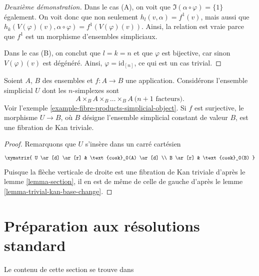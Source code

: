 \begin{proof}[Deuxième démonstration]
\medskip\noindent
Dans le cas (A), on voit que $\Im(\alpha \circ \varphi) = \{1\}$ également.
On voit donc que non seulement $h_l(v, \alpha) = f^1(v)$, mais aussi que
$h_k(V(\varphi)(v), \alpha \circ \varphi) = f^1(V(\varphi)(v))$.
Ainsi, la relation est vraie parce que $f^1$ est un morphisme d'ensembles
simpliciaux.

\medskip\noindent
Dans le cas (B), on conclut que $l = k = n$ et que
$\varphi$ est bijective, car sinon $V(\varphi)(v)$
est dégénéré. Ainsi, $\varphi = \text{id}_{[n]}$, ce qui est un cas trivial.
\end{proof}

\begin{lemma}
\label{lemma-cosk-minus-one-equivalence}
Soient $A$, $B$ des ensembles et $f : A \to B$ une application. Considérons
l'ensemble simplicial $U$ dont les $n$-simplexes sont
$$
A \times_B A \times_B \ldots \times_B A\ (n + 1 \text{ facteurs)}.
$$
Voir l'exemple \ref{example-fibre-products-simplicial-object}.
Si $f$ est surjective, le morphisme $U \to B$,
où $B$ désigne l'ensemble simplicial constant de valeur $B$,
est une fibration de Kan triviale.
\end{lemma}

\begin{proof}
Remarquons que $U$ s'insère dans un carré cartésien
$$
\xymatrix{
U \ar[d] \ar[r] & \text{cosk}_0(A) \ar[d] \\
B \ar[r] & \text{cosk}_0(B)
}
$$
Puisque la flèche verticale de droite est une fibration de Kan triviale
d'après le lemme \ref{lemma-section}, il en est de même de celle de gauche
d'après le lemme \ref{lemma-trivial-kan-base-change}.
\end{proof}




\section{Préparation aux résolutions standard}
\label{section-standard-pre}

\noindent
Le contenu de cette section se trouve dans \cite[Appendice 1]{Godement}

